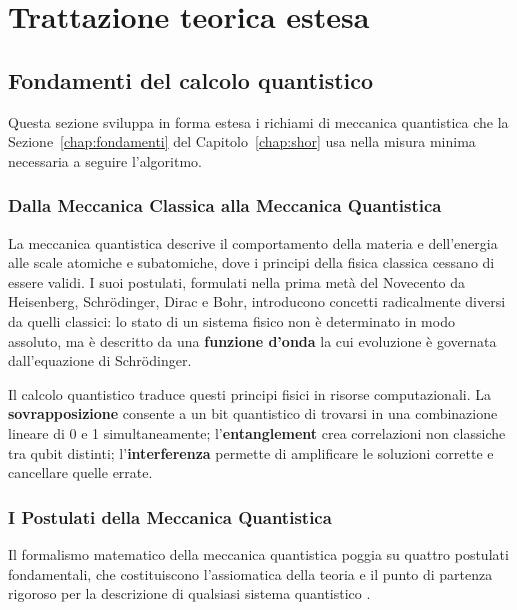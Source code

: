 \chapter{Trattazione teorica estesa}
\captionsetup[figure]{font=small,labelfont=bf}
\label{app:teoria}

\section{Fondamenti del calcolo quantistico}
\label{app:fondamenti}
\begin{onehalfspace}

Questa sezione sviluppa in forma estesa i richiami di meccanica quantistica che la
Sezione~\ref{chap:fondamenti} del Capitolo~\ref{chap:shor} usa nella misura
minima necessaria a seguire l'algoritmo.

\subsection{Dalla Meccanica Classica alla Meccanica Quantistica}

La meccanica quantistica descrive il comportamento della materia e dell'energia alle scale atomiche e subatomiche, dove i principi della fisica classica cessano di essere validi. I suoi postulati, formulati nella prima metà del Novecento da Heisenberg, Schrödinger, Dirac e Bohr, introducono concetti radicalmente diversi da quelli classici: lo stato di un sistema fisico non è determinato in modo assoluto, ma è descritto da una \textbf{funzione d'onda} la cui evoluzione è governata dall'equazione di Schrödinger.

Il calcolo quantistico traduce questi principi fisici in risorse computazionali. La \textbf{sovrapposizione} consente a un bit quantistico di trovarsi in una combinazione lineare di 0 e 1 simultaneamente; l'\textbf{entanglement} crea correlazioni non classiche tra qubit distinti; l'\textbf{interferenza} permette di amplificare le soluzioni corrette e cancellare quelle errate.

\clearpage
\subsection{I Postulati della Meccanica Quantistica}

Il formalismo matematico della meccanica quantistica poggia su quattro postulati fondamentali, che costituiscono l'assiomatica della teoria e il punto di partenza rigoroso per la descrizione di qualsiasi sistema quantistico \cite{nielsenChuang2000}.


\end{onehalfspace}
